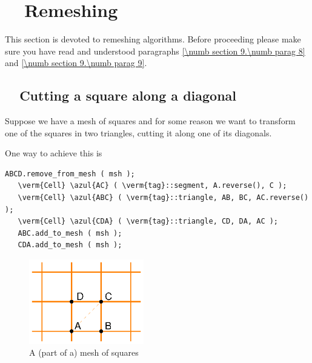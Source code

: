 
\chapter{~~Remeshing}\label{\numb section 10}

This section is devoted to remeshing algorithms.
Before proceeding please make sure you have read and understood paragraphs
\ref{\numb section 9.\numb parag 8} and \ref{\numb section 9.\numb parag 9}.


\section{~~Cutting a square along a diagonal}\label{\numb section 10.\numb parag 1}

Suppose we have a mesh of squares and for some reason we want to transform one of the
squares in two triangles, cutting it along one of its diagonals.

One way to achieve this is

\begin{Verbatim}[commandchars=\\\{\},formatcom=\small\tt,frame=single,
   label=parag-\ref{\numb section 10.\numb parag 1}.cpp,rulecolor=\color{coment},
   baselinestretch=0.94,framesep=2mm]
   ABCD.remove_from_mesh ( msh );
   \verm{Cell} \azul{AC} ( \verm{tag}::segment, A.reverse(), C );
   \verm{Cell} \azul{ABC} ( \verm{tag}::triangle, AB, BC, AC.reverse() );
   \verm{Cell} \azul{CDA} ( \verm{tag}::triangle, CD, DA, AC );
   ABC.add_to_mesh ( msh );
   CDA.add_to_mesh ( msh );
\end{Verbatim}

\begin{figure}[ht] \centering
  \includegraphics[width=50mm]{malha-quadr}
  \caption{A (part of a) mesh of squares}
  \label{\numb section 10.\numb fig 1}
\end{figure}

